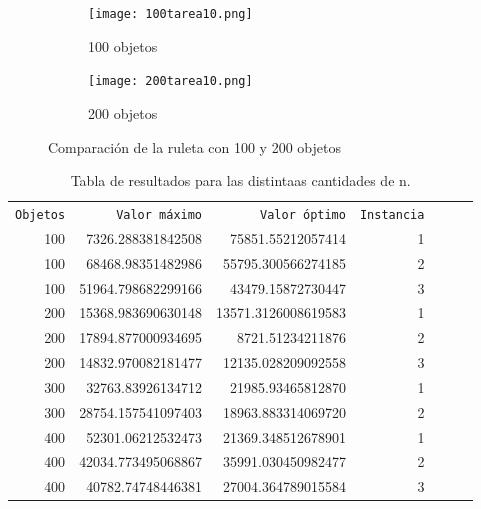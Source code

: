 \documentclass{article}
\begin{document}
\begin{figure}[H]
       \centering
       \begin{subfigure}[b]{0.60\linewidth}
           \texttt{[image: 100tarea10.png]}
           \caption{100 objetos}
           \label{fig:westminster_lateral}
        \end{subfigure}
          \begin{subfigure}[b]{0.60\linewidth}
           \texttt{[image: 200tarea10.png]}
           \caption{200 objetos}
           \label{fig:westminster_lateral}
        \end{subfigure}    
        \caption{Comparaci\'on de la ruleta con 100 y 200 objetos}
        \label{fig:westminster}
\end{figure}

\begin{table} [H]
 \caption{Tabla de resultados para las distintaas cantidades de n.}
 \label{t1}
 \begin{center}
 \begin{tabular}{rrrrrrr}
\texttt{Objetos} & \texttt{Valor m\'aximo} & \texttt{Valor \'optimo} &\texttt{Instancia} \\
100  & 7326.288381842508 & 75851.55212057414  & 1  \\ 
100  & 68468.98351482986 & 55795.300566274185    & 2\\ 
100  &  51964.798682299166 & 43479.15872730447  & 3  \\ 
200  &15368.983690630148  &13571.3126008619583  & 1  \\ 
200  & 17894.877000934695   &8721.51234211876 & 2 \\ 
200  & 14832.970082181477   & 12135.028209092558 & 3   \\ 
300  & 32763.83926134712 & 21985.93465812870 &  1 \\ 
300  & 28754.157541097403 & 18963.883314069720 & 2  \\ 
400 & 52301.06212532473&21369.348512678901  & 1  \\ 
400 & 42034.773495068867&35991.030450982477  & 2   \\ 
400 & 40782.74748446381& 27004.364789015584  & 3 \\ 


\end{tabular}
\end{center}
\end{table}
\end{document}
